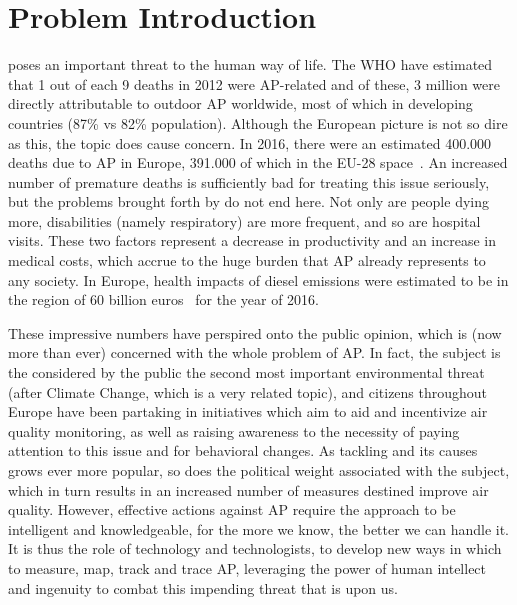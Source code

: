 

\section{Problem Introduction}%
\label{sec:problem_introduction}

 poses an important threat to the human way of life. The
\gls{WHO} have estimated that 1 out of each 9 deaths in 2012 were
\gls{AP}-related and of these, 3 million were directly attributable to
outdoor \gls{AP} worldwide, most of which in developing countries (87\%
vs 82\% population). Although the European picture is not so dire as
this, the topic does cause concern. In 2016, there were an estimated
400.000 deaths due to \gls{AP} in Europe, 391.000 of which in the EU-28
space~\cite{Guerreiro2019}. An increased number of premature deaths is
sufficiently bad for treating this issue seriously, but the problems
brought forth by  do not end here. Not only are people dying
more, disabilities (namely respiratory) are more frequent, and so are
hospital visits. These two factors represent a decrease in productivity
and an increase in medical costs, which accrue to the huge burden that
\gls{AP} already represents to any society. In Europe, health impacts of
diesel emissions were estimated to be in the region of 60 billion
euros~\cite{CEDelft2018} for the year of 2016.

These impressive numbers have perspired onto the public opinion, which
is (now more than ever) concerned with the whole problem of \gls{AP}. In
fact, the subject is the considered by the public the second most
important environmental threat (after Climate Change, which is a very
related topic), and citizens throughout Europe have been partaking in
initiatives which aim to aid and incentivize air quality monitoring, as
well as raising awareness to the necessity of paying attention to this
issue and for behavioral changes. As tackling  and its
causes grows ever more popular, so does the political weight associated
with the subject, which in turn results in an increased number of
measures destined improve air quality. However, effective actions
against \gls{AP} require the approach to be intelligent and
knowledgeable, for the more we know, the better we can handle it. It is
thus the role of technology and technologists, to develop new ways in
which to measure, map, track and trace \gls{AP}, leveraging the power of
human intellect and ingenuity to combat this impending threat that is
upon us.
